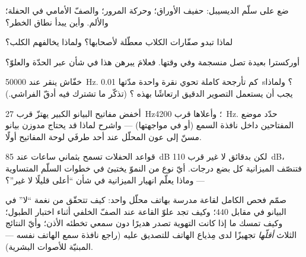 \begin{exercise}[$\star$]\label{exo:g8:sound-pitch-loudness:6}
ضع على سلّم الديسيبل: حفيف الأوراق؛ وحركة المرور؛ والصفّ
الأمامي في الحفلة؛ والألم. وأين يبدأ نطاق الخطر؟
\end{exercise}

\begin{exercise}[$\star$]\label{exo:g8:sound-pitch-loudness:7}
لماذا تبدو صفّارات الكلاب معطّلة لأصحابها؟ ولماذا يخالفهم
الكلب؟
\end{exercise}

\begin{exercise}[$\star$]\label{exo:g8:sound-pitch-loudness:8}
أوركسترا بعيدة تصل منسجمة وفي وقتها. فعلامَ يبرهن هذا في شأن
  عبر الحدّة والعلوّ؟
\end{exercise}

\begin{exercise}[$\star\star$]\label{exo:g8:sound-pitch-loudness:9}
خفّاش ينقر عند \qty{50000}{Hz}. كم تأرجحة كاملة تحوي نقرة
واحدة مدّتها \qty{0.01}{s}؟ ولماذا يجب أن يستعمل التصوير
الدقيق  ارتعاشًا بهذه ؟ (تذكّر ما تشترك فيه أدقّ
الفراشي.)
\end{exercise}

\begin{exercise}[$\star\star$]\label{exo:g8:sound-pitch-loudness:10}
أخفض مفاتيح البيانو الكبير يهتزّ قرب \qty{27}{Hz}؛ وأعلاها
قرب \qty{4200}{Hz}. حدّد موضع المفتاحين داخل نافذة السمع (أو
في مواجهتها) --- واشرح لماذا قد يحتاج مدوزن بيانو مسنّ إلى
عون المحلّل عند أحد طرفَي لوحة المفاتيح أولًا.
\end{exercise}

\begin{exercise}[$\star\star$]\label{exo:g8:sound-pitch-loudness:11}
قواعد الحفلات تسمح بثماني ساعات عند \qty{85}{dB} لكن بدقائق
لا غير قرب \qty{110}{dB}، فتنصّف الميزانية كل بضع درجات. أيّ
نوع من النموّ يختبئ في خطوات السلّم المتساوية --- وماذا يعلّم
انهيار الميزانية في شأن ``أعلى قليلًا لا غير''؟
\end{exercise}

\begin{exercise}[$\star\star\star$]\label{exo:g8:sound-pitch-loudness:12}
صمّم فحص  الكامل لقاعة مدرسة بهاتف محلّل واحد: كيف
تتحقّق من نغمة ``لا'' في البيانو في مقابل $440$؛ وكيف تجد
علوّ القاعة عند الصفّ الخلفي أثناء اختبار الطبول؛ وكيف تمسك
ما إذا كانت التهوية تصدر هديرًا دون سمعي تخطئه الأذن؛ وأيّ
النتائج الثلاث \emph{أقلّها} تجهيزًا لدى مِذياع الهاتف
للتصديق عليه (راجع نافذة سمع الهاتف نفسه --- المبنيّة
للأصوات البشرية).
\end{exercise}

